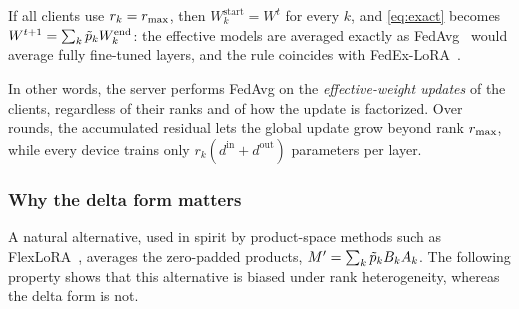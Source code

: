 \begin{corollary}\label{cor:fedavg}
If all clients use $r_k=r_{\max}$, then $W_k^{\mathrm{start}}=W^t$ for every $k$, and \cref{eq:exact}
becomes $W^{t+1}=\sum_k\tilde{p}_kW_k^{\mathrm{end}}$: the effective models are averaged exactly as
FedAvg~\cite{mcmahan2017fedavg} would average fully fine-tuned layers, and the rule coincides with
FedEx-LoRA~\cite{singhal2025fedex}.
\end{corollary}

In other words, the server performs FedAvg on the \emph{effective-weight updates} of the clients,
regardless of their ranks and of how the update is factorized. Over rounds, the accumulated
residual lets the global update grow beyond rank $r_{\max}$, while every device trains only
$r_k(d^{\mathrm{in}}+d^{\mathrm{out}})$ parameters per layer.

\subsubsection{Why the delta form matters}
A natural alternative, used in spirit by product-space methods such as
FlexLoRA~\cite{bai2024flexlora}, averages the zero-padded products,
$M'=\sum_k\tilde{p}_kB_kA_k$. The following property shows that this alternative is biased under rank
heterogeneity, whereas the delta form is not.

